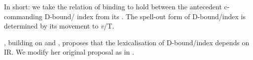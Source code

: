 \documentclass[output=paper,nonflat,colorlinks,citecolor=brown,newtxmath]{langsci/langscibook}
\begin{document}
In short: we take the relation of binding to hold between the antecedent c-commanding D-bound/ index from its . The spell-out form of D-bound/index is determined by its movement to \textit{v}/T.

\cite{nikolaeva2014}, building on \cite{chomsky1986k,vikner1985,pica1987,pica1991,hestvik1992} and \cite{avrutin1994}, proposes that the lexicalisation of D-bound/index depends on IR. We modify her original proposal as in .

\end{document}
